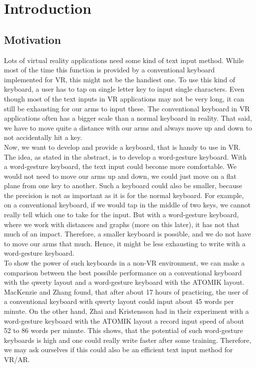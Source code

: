 \chapter{Introduction}

\section{Motivation}
Lots of virtual reality applications need some kind of text input method. While most of the time this function is provided by a conventional keyboard implemented for VR, this might not be the handiest one. To use this kind of keyboard, a user has to tap on single letter key to input single characters. Even though most of the text inputs in VR applications may not be very long, it can still be exhausting for our arms to input these. The conventional keyboard in VR applications often has a bigger scale than a normal keyboard in reality. That said, we have to move quite a distance with our arms and always move up and down to not accidentally hit a key.\\
Now, we want to develop and provide a keyboard, that is handy to use in VR. The idea, as stated in the abstract, is to develop a word-gesture keyboard. With a word-gesture keyboard, the text input could become more comfortable. We would not need to move our arms up and down, we could just move on a flat plane from one key to another. Such a keyboard could also be smaller, because the precision is not as important as it is for the normal keyboard. For example, on a conventional keyboard, if we would tap in the middle of two keys, we cannot really tell which one to take for the input. But with a word-gesture keyboard, where we work with distances and graphs (more on this later), it has not that much of an impact. Therefore, a smaller keyboard is possible, and we do not have to move our arms that much. Hence, it might be less exhausting to write with a word-gesture keyboard.\\
To show the power of such keyboards in a non-VR environment, we can make a comparison between the best possible performance on a conventional keyboard with the qwerty layout and a word-gesture keyboard with the ATOMIK layout. MacKenzie and Zhang \cite{10.1145/302979.302983} found, that after about 17 hours of practicing, the user of a conventional keyboard with qwerty layout could input about 45 words per minute. On the other hand, Zhai and Kristensson \cite{Kristensson2004SHARK2AL} had in their experiment with a word-gesture keyboard with the ATOMIK layout a record input speed of about 52 to 86 words per minute. This shows, that the potential of such word-gesture keyboards is high and one could really write faster after some training. Therefore, we may ask ourselves if this could also be an efficient text input method for VR/AR.

